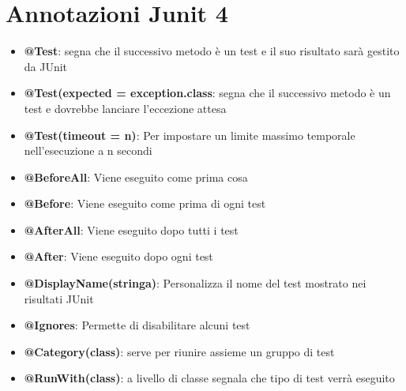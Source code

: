 \documentclass[11pt,a4paper]{book}
\begin{document}
\section{Annotazioni Junit 4}
\begin{itemize}
	\item \textbf{@Test}: segna che il successivo metodo è un test e il suo risultato sarà gestito da JUnit
	\item \textbf{@Test(expected = exception.class}: segna che il successivo metodo è un test e dovrebbe lanciare l'eccezione attesa
	\item \textbf{@Test(timeout = n)}: Per impostare un limite massimo temporale nell'esecuzione a n secondi
	\item \textbf{@BeforeAll}: Viene eseguito come prima cosa
	\item \textbf{@Before}: Viene eseguito come prima di ogni test
	\item \textbf{@AfterAll}: Viene eseguito dopo tutti i test
	\item \textbf{@After}: Viene eseguito dopo ogni test
	\item \textbf{@DisplayName(stringa)}: Personalizza il nome del test mostrato nei risultati JUnit
	\item \textbf{@Ignores}: Permette di disabilitare alcuni test
	\item \textbf{@Category(class)}: serve per riunire assieme un gruppo di test
	\item \textbf{@RunWith(class)}: a livello di classe segnala che tipo di test verrà eseguito
\end{itemize}
\end{document}
